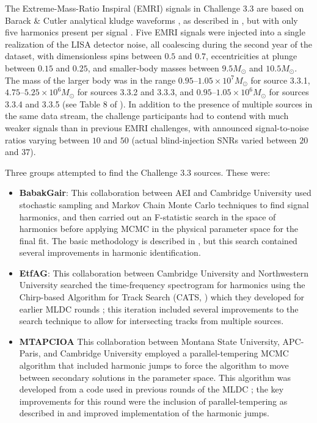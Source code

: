 \documentclass{iopart}
\begin{document}
The Extreme-Mass-Ratio Inspiral (EMRI) signals in Challenge 3.3 are based on Barack \& Cutler analytical kludge waveforms \cite{barackcutler}, as described in \cite{mldcgwdaw2}, but with only five harmonics present per signal \cite{MLDC3}.  Five EMRI signals were injected into a single realization of the LISA detector noise, all coalescing during the second year of the dataset, with dimensionless spins between $0.5$ and $0.7$, eccentricities at plunge between $0.15$ and $0.25$, and smaller-body masses between $9.5 M_\odot$ and $10.5 M_\odot$.  The mass of the larger body was in the range $0.95$--$1.05\times10^7 M_\odot$ for source 3.3.1,  $4.75$--$5.25 \times10^6 M_\odot$ for sources 3.3.2 and 3.3.3, and $0.95$--$1.05\times10^6 M_\odot$ for sources 3.3.4 and 3.3.5 (see Table 8 of \cite{MLDC3}).  In addition to the presence of multiple sources in the same data stream, the challenge participants had to contend with much weaker signals than in previous EMRI challenges, with announced signal-to-noise ratios varying between $10$ and $50$ (actual blind-injection SNRs varied between $20$ and $37$).

Three groups attempted to find the Challenge 3.3 sources.  These were:
\begin{itemize}
\item \textbf{BabakGair}: This collaboration between AEI and Cambridge University used stochastic sampling and Markov Chain Monte Carlo techniques to find signal harmonics, and then carried out an F-statistic search in the space of harmonics before applying MCMC in the physical parameter space for the final fit.  The basic methodology is described in \cite{BabakGairPorter}, but this search contained several improvements in harmonic identification.
\item \textbf{EtfAG}: This collaboration between Cambridge University and Northwestern University searched the time-frequency spectrogram for harmonics using the Chirp-based Algorithm for Track Search (CATS, \cite{CATS}) which they developed for earlier MLDC rounds \cite{GairMandelWen}; this iteration included several improvements to the search technique to allow for intersecting tracks from multiple sources.
\item \textbf{MTAPCIOA} This collaboration between Montana State University, APC-Paris, and Cambridge University employed a parallel-tempering MCMC algorithm that included harmonic jumps to force the algorithm to move between secondary solutions in the parameter space. This algorithm was developed from a code used in previous rounds of the MLDC \cite{Cornish:2008}; the key improvements for this round were the inclusion of parallel-tempering as described in \cite{keycornish} and improved implementation of the harmonic jumps.
\end{itemize}
\end{document}
